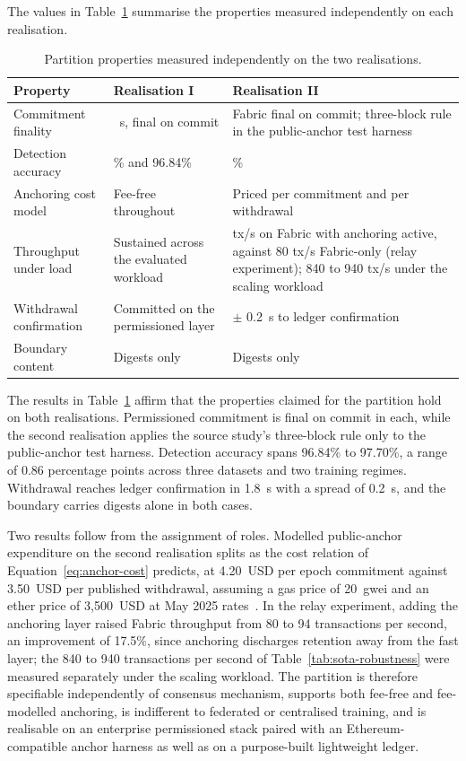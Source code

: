 The values in Table~\ref{tab:sub-properties} summarise the properties measured independently on each realisation.
\begin{table}[!htbp]
  \centering
  \footnotesize
  \setlength{\tabcolsep}{5pt}
  \renewcommand{\arraystretch}{1.3}
  \caption{Partition properties measured independently on the two realisations.}
  \label{tab:sub-properties}
  \begin{tabularx}{\textwidth}{@{}
      >{\raggedright\arraybackslash}p{4.0cm}
      >{\raggedright\arraybackslash}X
      >{\raggedright\arraybackslash}X@{}}
    \toprule
    \textbf{Property} & \textbf{Realisation I} & \textbf{Realisation II} \\
    \midrule
    Commitment finality & 0.11~s, final on commit & Fabric final on commit; three-block rule in the public-anchor test harness \\
    Detection accuracy & 97.70\% and 96.84\% & 97.40\% \\
    Anchoring cost model & Fee-free throughout & Priced per commitment and per withdrawal \\
    Throughput under load & Sustained across the evaluated workload & 94 tx/s on Fabric with anchoring active, against 80 tx/s Fabric-only (relay experiment); 840 to 940 tx/s under the scaling workload \\
    Withdrawal confirmation & Committed on the permissioned layer & 1.8 $\pm$ 0.2~s to ledger confirmation \\
    Boundary content & Digests only & Digests only \\
    \bottomrule
  \end{tabularx}
\end{table}
The results in Table~\ref{tab:sub-properties} affirm that the properties claimed for the partition hold on both realisations. Permissioned commitment is final on commit in each, while the second realisation applies the source study's three-block rule only to the public-anchor test harness. Detection accuracy spans 96.84\% to 97.70\%, a range of 0.86 percentage points across three datasets and two training regimes. Withdrawal reaches ledger confirmation in 1.8~s with a spread of 0.2~s, and the boundary carries digests alone in both cases.

Two results follow from the assignment of roles. Modelled public-anchor expenditure on the second realisation splits as the cost relation of Equation~\eqref{eq:anchor-cost} predicts, at 4.20~USD per epoch commitment against 3.50~USD per published withdrawal, assuming a gas price of 20~gwei and an ether price of 3{,}500~USD at May 2025 rates~\cite{amadi2026symmetric}. In the relay experiment, adding the anchoring layer raised Fabric throughput from 80 to 94 transactions per second, an improvement of 17.5\%, since anchoring discharges retention away from the fast layer; the 840 to 940 transactions per second of Table~\ref{tab:sota-robustness} were measured separately under the scaling workload.
The partition is therefore specifiable independently of consensus mechanism, supports both fee-free and fee-modelled anchoring, is indifferent to federated or centralised training, and is realisable on an enterprise permissioned stack paired with an Ethereum-compatible anchor harness as well as on a purpose-built lightweight ledger.

